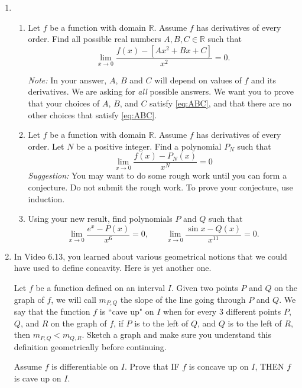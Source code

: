 \documentclass[12pt]{exam}
\newcommand {\DS} [1] {${\displaystyle #1}$}
\newcommand{\vv}{\vspace{.1cm}}
\newcommand{\R}{\mathbb{R}}
\begin{document}
\begin{enumerate}
\newpage

\item  
	\begin{enumerate}
				
		\item  Let $f$ be a function with domain $\R$.  Assume $f$ has derivatives of every order.  Find all possible real numbers $A, B, C \in \R$ such that
			\begin{equation} \label{eq:ABC}
				\lim_{x \to 0} \frac{f(x) - \left[ Ax^2 + B x + C \right]}{x^2} = 0.
			\end{equation}	
			
			\emph{Note:} In your answer, $A$, $B$ and $C$ will depend on values of $f$ and its derivatives.  We are asking for \emph{all} possible answers.  We want you to prove that your choices of $A$, $B$, and $C$ satisfy \eqref{eq:ABC}, and that there are no other choices that satisfy \eqref{eq:ABC}.
			
			
		\item  Let $f$ be a function with domain $\R$.  Assume $f$ has derivatives of every order.   Let $N$ be a positive integer.  Find a polynomial \DS{P_N} such that
			$$
				\lim_{x \to 0} \frac{f(x) - P_N(x)}{x^N} = 0
			$$
			\emph{Suggestion:} You may want to do some rough work until you can form a conjecture.    Do not submit the rough work.  To prove your conjecture, use induction.
		\item  Using your new result, find polynomials $P$  and $Q$ such that
			$$
				\lim_{x \to 0} \frac{e^x - P(x)}{x^6} = 0, \quad \quad \lim_{x \to 0} \frac{\sin x - Q(x)}{x^{11}} = 0.
			$$
	\end{enumerate}

\vv

\item  In Video 6.13, you learned about various geometrical notions that we could have used to define concavity.  Here is yet another one.

 Let $f$ be a function defined on an interval $I$.  Given two points $P$ and $Q$ on the graph of $f$, we will call $m_{P,Q}$ the slope of the line going through $P$ and $Q$.  We say that the function $f$ is ``cave up" on $I$ when for every 3 different points $P$, $Q$, and $R$ on the graph of $f$, if $P$ is to the left of $Q$, and $Q$ is to the left of $R$, then $m_{P,Q} < m_{Q,R}$.  Sketch a graph and make sure you understand this definition geometrically  before continuing.
 
 Assume $f$ is differentiable on $I$. 
		Prove that IF $f$ is concave up on $I$, THEN $f$ is cave up on $I$.



\end{enumerate}
\end{document}
